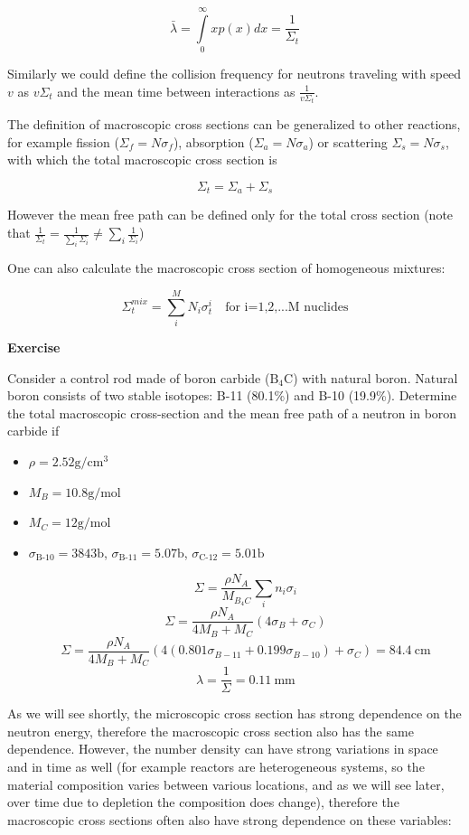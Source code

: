 \[
\bar\lambda=\int\limits_0^\infty xp(x)dx=\frac{1}{\Sigma_t}
\]

Similarly we could define the collision frequency for neutrons traveling with speed $v$ as $v\Sigma_t$ and the mean time between interactions as $\frac{1}{v\Sigma_t}$.

The definition of macroscopic cross sections can be generalized to other reactions, for example fission ($\Sigma_f=N\sigma_f$), absorption ($\Sigma_a=N\sigma_a$) or scattering $\Sigma_s=N\sigma_s$, with which the total macroscopic cross section is

\[
\Sigma_t=\Sigma_a+\Sigma_s
\]

However the mean free path can be defined only for the total cross section (note that $\frac{1}{\Sigma_t} = \frac{1}{\sum\limits_i \Sigma_i}\neq \sum\limits_i\frac{1}{\Sigma_i}$)

One can also calculate the macroscopic cross section of homogeneous mixtures:

\[
\Sigma_t^{mix}=\sum\limits_i^M N_i\sigma_t^i \quad \text{for i=1,2,...M nuclides}
\]

\begin{tcolorbox}
\textbf{Exercise}

Consider a control rod made of boron carbide ($\text{B}_4\text{C}$) with natural boron. Natural boron consists of two stable isotopes: B-11 (80.1\%) and B-10 (19.9\%). Determine the total macroscopic cross-section and the mean free path of a neutron in boron carbide if
\begin{itemize}
\item $\rho = 2.52\text{g}/\text{cm}^3$
\item $M_B = 10.8\text{g}/\text{mol}$
\item $M_C = 12\text{g}/\text{mol}$
\item $\sigma_{\text{B-10}}=3843 \text{b}$, $\sigma_{\text{B-11}}=5.07 \text{b}$, $\sigma_{\text{C-12}}=5.01 \text{b}$

$$\Sigma=\frac{\rho N_A}{M_{B_4C}}\sum_in_i\sigma_i$$
$$\Sigma=\frac{\rho N_A}{4M_{B}+M_{C}}(4\sigma_B+\sigma_C)$$
$$\Sigma=\frac{\rho N_A}{4M_{B}+M_{C}}(4(0.801\sigma_{B-11}+0.199\sigma_{B-10})+\sigma_C)=84.4 \: \text{cm}$$
$$\lambda=\frac{1}{\Sigma}=0.11\:\text{mm}$$
\end{itemize}
 \end{tcolorbox}

As we will see shortly, the microscopic cross section has strong dependence on the neutron energy, therefore the macroscopic cross section also has the same dependence. However, the number density can have strong variations in space and in time as well (for example reactors are heterogeneous systems, so the material composition varies between various locations, and as we will see later, over time due to depletion the composition does change), therefore the macroscopic cross sections often also have strong dependence on these variables:

